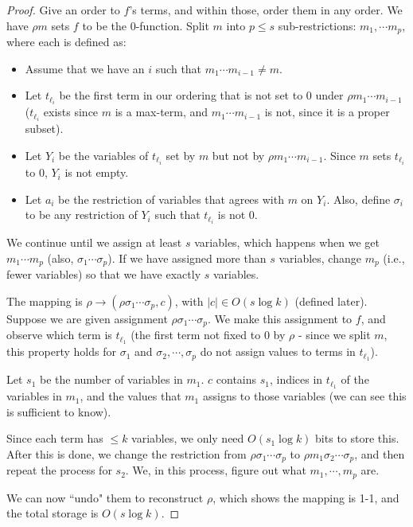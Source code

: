 \begin{proof}
\par Give an order to $f$'s terms, and within those, order them in any order. We have $\rho m$ sets $f$ to be the 0-function. Split $m$ into $p \le s$ sub-restrictions: $m_1, \cdots m_p$, where each is defined as:
\begin{itemize}
\item Assume that we have an $i$ such that $m_1\cdots m_{i-1} \ne m$.
\item Let $t_{\ell_i}$ be the first term in our ordering that is not set to 0 under $\rho m_1\cdots m_{i-1}$ ($t_{\ell_i}$ exists since $m$ is a max-term, and $m_1\cdots m_{i-1}$ is not, since it is a proper subset).
\item Let $Y_i$ be the variables of $t_{\ell_i}$ set by $m$ but not by $\rho m_1\cdots m_{i-1}$. Since $m$ sets $t_{\ell_i}$ to 0, $Y_i$ is not empty. 
\item Let $a_i$ be the restriction of variables that agrees with $m$ on $Y_i$. Also, define $\sigma_i$ to be any restriction of $Y_i$ such that $t_{\ell_i}$ is not 0.
\end{itemize}
We continue until we assign at least $s$ variables, which happens when we get $m_1\cdots m_p$ (also, $\sigma_1 \cdots \sigma_p$). If we have assigned more than $s$ variables, change $m_p$ (i.e., fewer variables) so that we have exactly $s$ variables.

\par The mapping is $\rho \rightarrow (\rho\sigma_1\cdots\sigma_p, c)$, with $|c| \in O(s \log k)$ (defined later). Suppose we are given assignment $\rho\sigma_1\cdots\sigma_p$. We make this assignment to $f$, and observe which term is $t_{\ell_1}$ (the first term not fixed to 0 by $\rho$ - since we split $m$, this property holds for $\sigma_1$ and $\sigma_2, \cdots, \sigma_p$ do not assign values to terms in $t_{\ell_1}$). 

\par Let $s_1$ be the number of variables in $m_1$. $c$ contains $s_1$, indices in $t_{\ell_1}$ of the variables in $m_1$, and the values that $m_1$ assigns to those variables (we can see this is sufficient to know). 

\par Since each term has $\le k$ variables, we only need $O(s_1 \log k)$ bits to store this. After this is done, we change the restriction from $\rho\sigma_1\cdots\sigma_p$ to $\rho m_1 \sigma_2\cdots\sigma_p$, and then repeat the process for $s_2$. We, in this process, figure out what $m_1, \cdots, m_p$ are. 

\par We can now ``undo" them to reconstruct $\rho$, which shows the mapping is 1-1, and the total storage is $O(s \log k)$. 
\end{proof}

